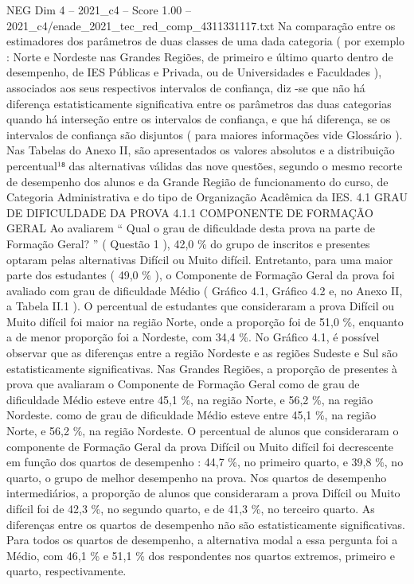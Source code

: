 \begin{textsample}{NEG Dim 4 – 2021\_c4 – Score 1.00 – 2021\_c4/enade\_2021\_tec\_red\_comp\_4311331117.txt}
Na comparação entre os estimadores dos parâmetros de duas classes de uma dada categoria ( por exemplo : Norte e Nordeste nas Grandes Regiões, de primeiro e último quarto dentro de desempenho, de IES Públicas e Privada, ou de Universidades e Faculdades ), associados aos seus respectivos intervalos de confiança, diz -se que não há diferença estatisticamente significativa entre os parâmetros das duas categorias quando há interseção entre os intervalos de confiança, e que há diferença, se os intervalos de confiança são disjuntos ( para maiores informações vide Glossário ).
Nas Tabelas do Anexo II, são apresentados os valores absolutos e a distribuição percentual¹⁸ das alternativas válidas das nove questões, segundo o mesmo recorte de desempenho dos alunos e da Grande Região de funcionamento do curso, de Categoria Administrativa e do tipo de Organização Acadêmica da IES. 4.1 GRAU DE DIFICULDADE DA PROVA 4.1.1 COMPONENTE DE FORMAÇÃO GERAL Ao avaliarem “ Qual o grau de dificuldade desta prova na parte de Formação Geral? ” ( Questão 1 ), 42,0 \% do grupo de inscritos e presentes optaram pelas alternativas Difícil ou Muito difícil.
Entretanto, para uma maior parte dos estudantes ( 49,0 \% ), o Componente de Formação Geral da prova foi avaliado com grau de dificuldade Médio ( Gráfico 4.1, Gráfico 4.2 e, no Anexo II, a Tabela II.1 ).
O percentual de estudantes que consideraram a prova Difícil ou Muito difícil foi maior na região Norte, onde a proporção foi de 51,0 \%, enquanto a de menor proporção foi a Nordeste, com 34,4 \%.
No Gráfico 4.1, é possível observar que as diferenças entre a região Nordeste e as regiões Sudeste e Sul são estatisticamente significativas.
Nas Grandes Regiões, a proporção de presentes à prova que avaliaram o Componente de Formação Geral como de grau de dificuldade Médio esteve entre 45,1 \%, na região Norte, e 56,2 \%, na região Nordeste. como de grau de dificuldade Médio esteve entre 45,1 \%, na região Norte, e 56,2 \%, na região Nordeste.
O percentual de alunos que consideraram o componente de Formação Geral da prova Difícil ou Muito difícil foi decrescente em função dos quartos de desempenho : 44,7 \%, no primeiro quarto, e 39,8 \%, no quarto, o grupo de melhor desempenho na prova.
Nos quartos de desempenho intermediários, a proporção de alunos que consideraram a prova Difícil ou Muito difícil foi de 42,3 \%, no segundo quarto, e de 41,3 \%, no terceiro quarto.
As diferenças entre os quartos de desempenho não são estatisticamente significativas.
Para todos os quartos de desempenho, a alternativa modal a essa pergunta foi a Médio, com 46,1 \% e 51,1 \% dos respondentes nos quartos extremos, primeiro e quarto, respectivamente.

\end{textsample}
